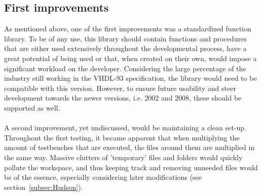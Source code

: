 \documentclass[11pt,british]{article}
\begin{document}
\newpage{}
\subsection{First improvements}
As mentioned above, one of the first improvements was a standardized function library. To be of any use, this library should contain functions and procedures that are either used extensively throughout the developmental process, have a great potential of being used or that, when created on their own, would impose a significant workload on the developer. Considering the large percentage of the industry still working in the VHDL-93 specification, the library would need to be compatible with this version. However, to ensure future usability and steer development towards the newer versions, i.e. 2002 and 2008, these should be supported as well.\\
\\
A second improvement, yet undiscussed, would be maintaining a clean set-up. Throughout the first testing, it became apparent that when multiplying the amount of testbenches that are executed, the files around them are multiplied in the same way. Massive clutters of 'temporary' files and folders would quickly pollute the workspace, and thus keeping track and removing unneeded files would be of the essence, especially considering later modifications (see section~\ref{subsec:Hudson}).
\end{document}
